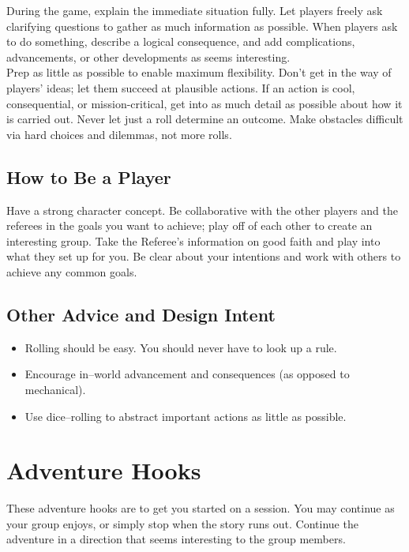 \documentclass[a4,landscape]{book}
\begin{document}
\begin{multicols*}{4}
During the game, explain the immediate situation fully.
Let players freely ask clarifying questions to gather as much information as possible.
When players ask to do something, describe a logical consequence, and add complications, advancements, or other developments as seems interesting. \\

Prep as little as possible to enable maximum flexibility.
Don't get in the way of players' ideas; let them succeed at plausible actions.
If an action is cool, consequential, or mission-critical, get into as much detail as possible about how it is carried out.
Never let just a roll determine an outcome.
Make obstacles difficult via hard choices and dilemmas, not more rolls. \\

\subsection*{How to Be a Player}

Have a strong character concept.
Be collaborative with the other players and the referees in the goals you want to achieve; play off of each other to create an interesting group.
Take the Referee's information on good faith and play into what they set up for you.
Be clear about your intentions and work with others to achieve any common goals. \\

\subsection*{Other Advice and Design Intent}

\begin{itemize}
\item Rolling should be easy. You should never have to look up a rule.
\item Encourage in--world advancement and consequences (as opposed to mechanical).
\item Use dice--rolling to abstract important actions as little as possible.
\end{itemize}

\section*{Adventure Hooks}

These adventure hooks are to get you started on a session.
You may continue as your group enjoys, or simply stop when the story runs out.
Continue the adventure in a direction that seems interesting to the group members. \\


\end{multicols*}
\end{document}
